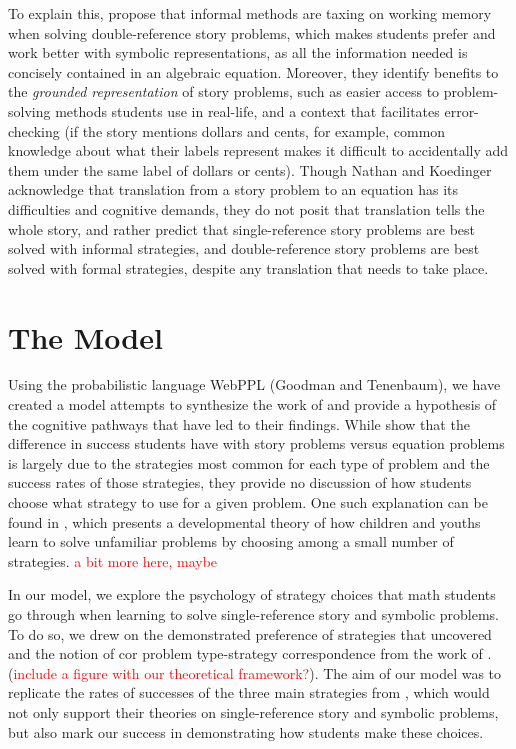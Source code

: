 \documentclass[10pt,letterpaper]{article}
\newcommand\TODO[1]{\textcolor{red}{#1}}
\begin{document}
	To explain this,  propose that informal methods are taxing on working memory when solving double-reference story problems, which makes students prefer and work better with symbolic representations, as all the information needed is concisely contained in an algebraic equation. Moreover, they identify benefits to the \textit{grounded representation} of story problems, such as easier access to problem-solving methods students use in real-life, and a context that facilitates error-checking (if the story mentions dollars and cents, for example, common knowledge about what their labels represent makes it difficult to accidentally add them under the same label of dollars or cents). Though Nathan and Koedinger acknowledge that translation from a story problem to an equation has its difficulties and cognitive demands, they do not posit that translation tells the whole story, and rather predict that single-reference story problems are best solved with informal strategies, and double-reference story problems are best solved with formal strategies, despite any translation that needs to take place.
	
	
	\section{The Model}
	
	
	
	Using the probabilistic language WebPPL ({Goodman and Tenenbaum}), we have created a model attempts to synthesize the work of  and provide a hypothesis of the cognitive pathways that have led to their findings. %
	While  show that the difference in success students have with story problems versus equation problems is largely due to the strategies most common for each type of problem and the success rates of those strategies, they provide no discussion of how students choose what strategy to use for a given problem. One such explanation can be found in \cite{Siegler}, which presents a developmental theory of how children and youths learn to solve unfamiliar problems by choosing among a small number of strategies. \TODO{a bit more here, maybe}
	
	In our model, we explore the psychology of strategy choices that math students go through when learning to solve single-reference story and symbolic problems. To do so, we drew on the demonstrated preference of strategies that  uncovered and the notion of cor problem type-strategy correspondence from the work of . (\TODO{include a figure with our theoretical framework?}). The aim of our model was to replicate the rates of successes of the three main strategies from \cite{KoedNath2004}, which would not only support their theories on single-reference story and symbolic problems, but also mark our success in demonstrating how students make these choices.
	
\end{document}
